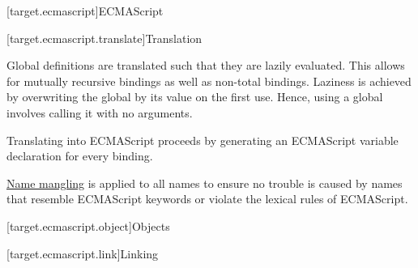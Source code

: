 [target.ecmascript]{ECMAScript}

[target.ecmascript.translate]{Translation}

Global definitions are translated
such that they are lazily evaluated.
This allows for mutually recursive bindings
as well as non-total bindings.
Laziness is achieved
by overwriting the global
by its value
on the first use.
Hence, using a global
involves calling it
with no arguments.

Translating 
into ECMAScript
proceeds by generating
an ECMAScript variable declaration
for every  binding.

\hyperref[name.mangle]{Name mangling} is applied
to all names
to ensure no trouble is caused
by names that resemble ECMAScript keywords
or violate the lexical rules of ECMAScript.

[target.ecmascript.object]{Objects}

[target.ecmascript.link]{Linking}
